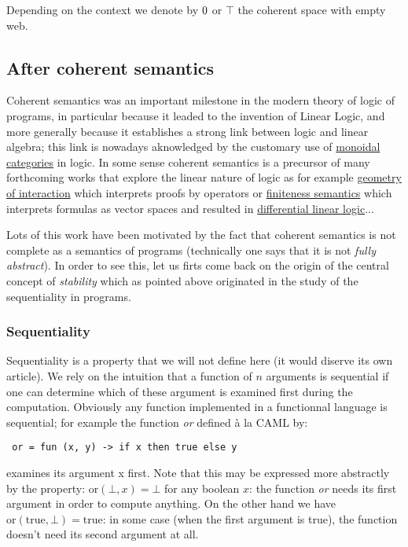 Depending on the context we denote by \(0\) or \(\top\) the coherent
space with empty web.

\subsection{After coherent semantics}\label{after-coherent-semantics}

Coherent semantics was an important milestone in the modern theory of
logic of programs, in particular because it leaded to the invention of
Linear Logic, and more generally because it establishes a strong link
between logic and linear algebra; this link is nowadays aknowledged by
the customary use of \href{Categorical_semantics}{monoidal categories}
in logic. In some sense coherent semantics is a precursor of many
forthcoming works that explore the linear nature of logic as for example
\href{geometry_of_interaction}{geometry of interaction} which interprets
proofs by operators or \href{finiteness_semantics}{finiteness semantics}
which interprets formulas as vector spaces and resulted in
\href{differential_linear_logic}{differential linear logic}...

Lots of this work have been motivated by the fact that coherent
semantics is not complete as a semantics of programs (technically one
says that it is not \emph{fully abstract}). In order to see this, let us
firts come back on the origin of the central concept of \emph{stability}
which as pointed above originated in the study of the sequentiality in
programs.

\subsubsection{Sequentiality}\label{sequentiality}

Sequentiality is a property that we will not define here (it would
diserve its own article). We rely on the intuition that a function of
\(n\) arguments is sequential if one can determine which of these
argument is examined first during the computation. Obviously any
function implemented in a functionnal language is sequential; for
example the function \emph{or} defined à la CAML by:

\texttt{~or\ =\ fun\ (x,\ y)\ -\textgreater{}\ if\ x\ then\ true\ else\ y}

examines its argument x first. Note that this may be expressed more
abstractly by the property: \(\mathrm{or}(\bot, x) = \bot\) for any
boolean \(x\): the function \emph{or} needs its first argument in order
to compute anything. On the other hand we have
\(\mathrm{or}(\mathrm{true}, \bot) = \mathrm{true}\): in some case (when
the first argument is true), the function doesn't need its second
argument at all.

